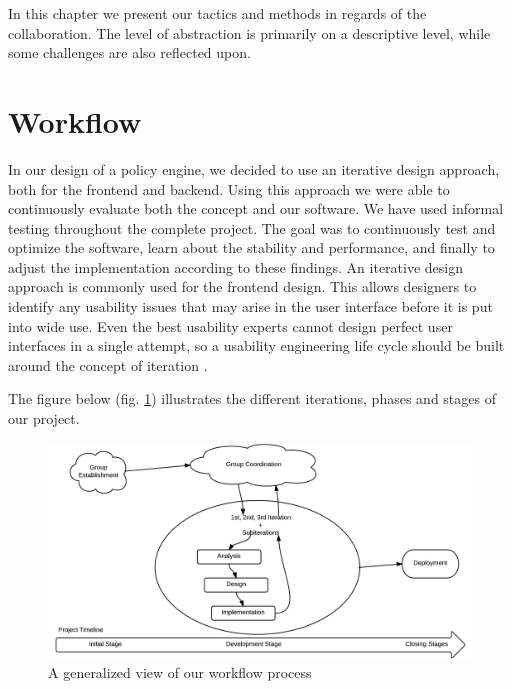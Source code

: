 In this chapter we present our tactics and methods in regards of the collaboration. The level of abstraction is primarily on a descriptive level, while some challenges are also reflected upon. 

\section{Workflow} \label{sec:workflow}
In our design of a policy engine, we decided to use an iterative design approach, both for the frontend and backend. Using this approach we were able to continuously evaluate both the concept and our software. We have used informal testing throughout the complete project. The goal was to continuously test and optimize the software, learn about the stability and performance, and finally to adjust the implementation according to these findings.  An iterative design approach is commonly used for the frontend design. This allows designers to identify any usability issues that may arise in the user interface before it is put into wide use. Even the best usability experts cannot design perfect user interfaces in a single attempt, so a usability engineering life cycle should be built around the concept of iteration \cite{Nielsen1993}.

The figure below (fig. \ref{fig:workflow}) illustrates the different iterations, phases and stages of our project.

\begin{figure}[ht]
\centering
\includegraphics[width=\columnwidth]{images/workflow.png}
\caption{A generalized view of our workflow process}
\label{fig:workflow}
\end{figure}

